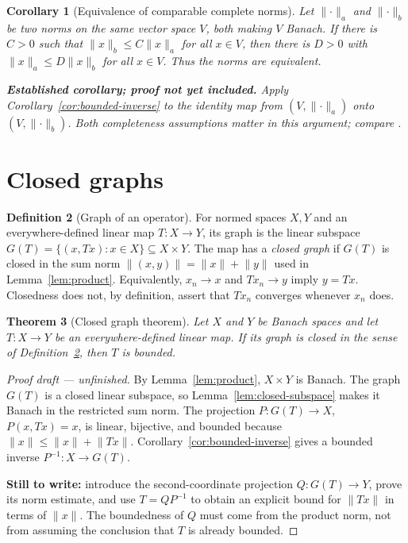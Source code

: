 \documentclass[11pt,a4paper]{article}
\theoremstyle{definition}
\newtheorem{definition}{Definition}[section]
\theoremstyle{plain}
\newtheorem{theorem}[definition]{Theorem}
\newtheorem{corollary}[definition]{Corollary}
\newcommand{\norm}[1]{\lVert #1\rVert}
\begin{document}
\begin{corollary}[Equivalence of comparable complete norms]\label{cor:equivalent-norms}
Let $\norm{\cdot}_a$ and $\norm{\cdot}_b$ be two norms on the same vector
space $V$, both making $V$ Banach. If there is $C>0$ such that
$\norm{x}_b\le C\norm{x}_a$ for all $x\in V$, then there is $D>0$ with
$\norm{x}_a\le D\norm{x}_b$ for all $x\in V$. Thus the norms are equivalent.

\normalfont\smallskip
\textbf{Established corollary; proof not yet included.}
Apply Corollary~\ref{cor:bounded-inverse} to the identity map from
$(V,\norm{\cdot}_a)$ onto $(V,\norm{\cdot}_b)$.
Both completeness assumptions matter in this argument; compare
\cite[Corollary 8]{shalit}.
\end{corollary}

\section{Closed graphs}

\begin{definition}[Graph of an operator]\label{def:graph}
For normed spaces $X,Y$ and an everywhere-defined linear map $T:X\to Y$,
its graph is the linear subspace
$G(T)=\{(x,Tx):x\in X\}\subseteq X\times Y$.
The map has a \emph{closed graph} if $G(T)$ is closed in the sum norm
$\norm{(x,y)}=\norm{x}+\norm{y}$ used in Lemma~\ref{lem:product}.
Equivalently, $x_n\to x$ and $Tx_n\to y$ imply $y=Tx$.
Closedness does not, by definition, assert that $Tx_n$ converges whenever
$x_n$ does.
\end{definition}

\begin{theorem}[Closed graph theorem]\label{thm:closed-graph}
Let $X$ and $Y$ be Banach spaces and let $T:X\to Y$ be an
everywhere-defined linear map. If its graph is closed in the sense of
Definition~\ref{def:graph}, then $T$ is bounded.
\end{theorem}
\begin{proof}[Proof draft --- unfinished]
By Lemma~\ref{lem:product}, $X\times Y$ is Banach. The graph $G(T)$ is
a closed linear subspace, so Lemma~\ref{lem:closed-subspace} makes it
Banach in the restricted sum norm.
The projection
$P:G(T)\to X$, $P(x,Tx)=x$, is linear, bijective, and bounded because
$\norm{x}\le\norm{x}+\norm{Tx}$.
Corollary~\ref{cor:bounded-inverse} gives a bounded inverse
$P^{-1}:X\to G(T)$.

\textbf{Still to write:} introduce the second-coordinate projection
$Q:G(T)\to Y$, prove its norm estimate, and use $T=QP^{-1}$ to obtain
an explicit bound for $\norm{Tx}$ in terms of $\norm{x}$.
The boundedness of $Q$ must come from the product norm, not from assuming
the conclusion that $T$ is already bounded.
\renewcommand{\qedsymbol}{}
\end{proof}
\end{document}
